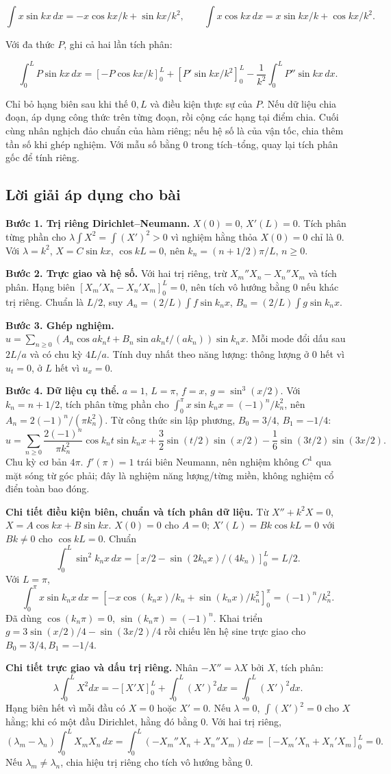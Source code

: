 \documentclass[10pt,a4paper]{article}
\begin{document}
\[
\int x\sin kx\,dx=-x\cos kx/k+\sin kx/k^2,\qquad
\int x\cos kx\,dx=x\sin kx/k+\cos kx/k^2.
\]


Với đa thức $P$, ghi cả hai lần tích phân:


\[
\int_0^L P\sin kx\,dx
=\left[-P\cos kx/k\right]_0^L+
\left[P'\sin kx/k^2\right]_0^L-
\frac1{k^2}\int_0^L P''\sin kx\,dx.
\]


Chỉ bỏ hạng biên sau khi thế $0,L$ và điều kiện thực sự của $P$. Nếu dữ liệu chia đoạn, áp dụng công thức trên từng đoạn, rồi cộng các hạng tại điểm chia. Cuối cùng nhân nghịch đảo chuẩn của hàm riêng; nếu hệ số là của vận tốc, chia thêm tần số khi ghép nghiệm. Với mẫu số bằng $0$ trong tích–tổng, quay lại tích phân gốc để tính riêng.
\subsection*{Lời giải áp dụng cho bài}
\textbf{Bước 1. Trị riêng Dirichlet–Neumann.} $X(0)=0$, $X'(L)=0$. Tích phân từng phần cho $\lambda\int X^2=\int(X')^2>0$ vì nghiệm hằng thỏa $X(0)=0$ chỉ là $0$. Với $\lambda=k^2$, $X=C\sin kx$, $\cos kL=0$, nên $k_n=(n+1/2)\pi/L$, $n\ge0$.

\textbf{Bước 2. Trực giao và hệ số.} Với hai trị riêng, trừ $X_m''X_n-X_n''X_m$ và tích phân. Hạng biên $[X_m'X_n-X_n'X_m]_0^L=0$, nên tích vô hướng bằng $0$ nếu khác trị riêng. Chuẩn là $L/2$, suy $A_n=(2/L)\int f\sin k_nx$, $B_n=(2/L)\int g\sin k_nx$.

\textbf{Bước 3. Ghép nghiệm.} $u=\sum_{n\ge0}(A_n\cos ak_nt+B_n\sin ak_nt/(ak_n))\sin k_nx$. Mỗi mode đổi dấu sau $2L/a$ và có chu kỳ $4L/a$. Tính duy nhất theo năng lượng: thông lượng ở $0$ hết vì $u_t=0$, ở $L$ hết vì $u_x=0$.

\textbf{Bước 4. Dữ liệu cụ thể.} $a=1$, $L=\pi$, $f=x$, $g=\sin^3(x/2)$. Với $k_n=n+1/2$, tích phân từng phần cho $\int_0^\pi x\sin k_nx=(-1)^n/k_n^2$, nên $A_n=2(-1)^n/(\pi k_n^2)$. Từ công thức sin lập phương, $B_0=3/4$, $B_1=-1/4$:
\[u=\sum_{n\ge0}\frac{2(-1)^n}{\pi k_n^2}\cos k_nt\sin k_nx
+\frac32\sin(t/2)\sin(x/2)-\frac16\sin(3t/2)\sin(3x/2).\]
Chu kỳ cơ bản $4\pi$. $f'(\pi)=1$ trái biên Neumann, nên nghiệm không $C^1$ qua mặt sóng từ góc phải; đây là nghiệm năng lượng/từng miền, không nghiệm cổ điển toàn bao đóng.

\textbf{Chi tiết điều kiện biên, chuẩn và tích phân dữ liệu.} Từ $X''+k^2X=0$, $X=A\cos kx+B\sin kx$. $X(0)=0$ cho $A=0$; $X'(L)=Bk\cos kL=0$ với $Bk\ne0$ cho $\cos kL=0$. Chuẩn
\[\int_0^L\sin^2k_nx\,dx=\left[x/2-\sin(2k_nx)/(4k_n)\right]_0^L=L/2.\]
Với $L=\pi$,
\[\int_0^\pi x\sin k_nx\,dx=
\left[-x\cos(k_nx)/k_n+\sin(k_nx)/k_n^2\right]_0^\pi
=(-1)^n/k_n^2.\]
Đã dùng $\cos(k_n\pi)=0$, $\sin(k_n\pi)=(-1)^n$. Khai triển $g=3\sin(x/2)/4-\sin(3x/2)/4$ rồi chiếu lên hệ sine trực giao cho $B_0=3/4,B_1=-1/4$.

\textbf{Chi tiết trực giao và dấu trị riêng.} Nhân $-X''=\lambda X$ bởi $X$, tích phân:
\[\lambda\int_0^LX^2dx=-[X'X]_0^L+\int_0^L(X')^2dx=\int_0^L(X')^2dx.\]
Hạng biên hết vì mỗi đầu có $X=0$ hoặc $X'=0$. Nếu $\lambda=0$, $\int(X')^2=0$ cho $X$ hằng; khi có một đầu Dirichlet, hằng đó bằng $0$. Với hai trị riêng,
\[(\lambda_m-\lambda_n)\int_0^LX_mX_n\,dx
=\int_0^L(-X_m''X_n+X_n''X_m)dx
=[-X_m'X_n+X_n'X_m]_0^L=0.\]
Nếu $\lambda_m\ne\lambda_n$, chia hiệu trị riêng cho tích vô hướng bằng $0$.
\end{document}
